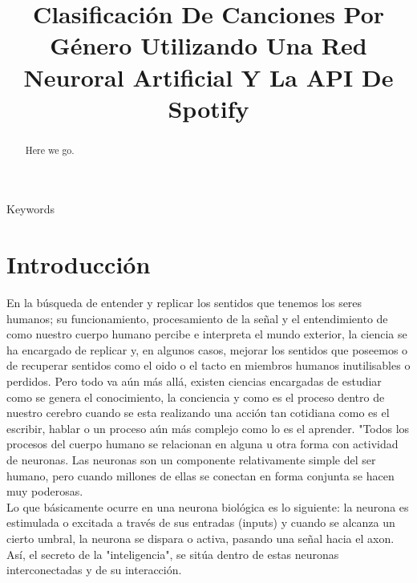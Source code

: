 \documentclass[conference]{IEEEtran}
\begin{document}
\title{  Clasificación De Canciones Por Género Utilizando Una Red Neuroral Artificial Y La API De Spotify }
\author{

\and
{}
}

\maketitle
\renewcommand\abstractname{Abstract}
\begin{abstract}
Here we go. \\
\end{abstract}

\begin{IEEEkeywords}
Keywords
\end{IEEEkeywords}

\IEEEpeerreviewmaketitle
\section{Introducción}
En la búsqueda de entender y replicar los sentidos que tenemos los seres humanos; su funcionamiento, procesamiento de la señal y el entendimiento de como nuestro cuerpo humano percibe e interpreta el mundo exterior, la ciencia se ha encargado de replicar y, en algunos casos, mejorar los sentidos que poseemos o de recuperar sentidos como el oido o el tacto en miembros humanos inutilisables o perdidos. Pero todo va aún más allá, existen ciencias encargadas de estudiar como se genera el conocimiento, la conciencia y como es el proceso dentro de nuestro cerebro cuando se esta realizando una acción tan cotidiana como es el escribir, hablar o un proceso aún más complejo como lo es el aprender. "Todos los procesos del cuerpo humano se relacionan en alguna u otra forma con actividad de neuronas. Las neuronas son un componente relativamente simple del ser humano, pero cuando millones de ellas se conectan en forma conjunta se hacen muy poderosas. \\
Lo que básicamente ocurre en una neurona biológica es lo siguiente: la neurona es estimulada o excitada a través de sus entradas (inputs) y cuando se alcanza un cierto umbral, la neurona se dispara o activa, pasando una señal hacia el axon. Así, el secreto de la "inteligencia", se sitúa dentro de estas neuronas interconectadas y de su interacción.\\
\end{document}
